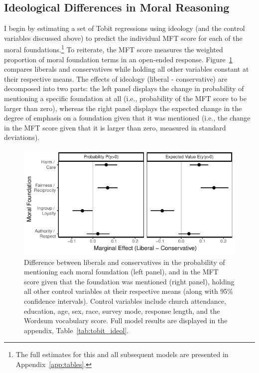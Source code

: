 \documentclass[12pt]{article}
\begin{document}


\subsection*{Ideological Differences in Moral Reasoning}

I begin by estimating a set of Tobit regressions using ideology (and the control variables discussed above) to predict the individual MFT score for each of the moral foundations.\footnote{The full estimates for this and all subsequent models are presented in Appendix~\ref{app:tables}.} To reiterate, the MFT score measures the weighted proportion of moral foundation terms in an open-ended response. Figure~\ref{fig:tobit_ideol} compares liberals and conservatives while holding all other variables constant at their respective means. The effects of ideology (liberal - conservative) are decomposed into two parts: the left panel displays the change in probability of mentioning a specific foundation at all (i.e., probability of the MFT score to be larger than zero), whereas the right panel displays the expected change in the degree of emphasis on a foundation given that it was mentioned  (i.e., the change in the MFT score given that it is larger than zero, measured in standard deviations).

\begin{figure}[ht]\centering
\includegraphics{../calc/fig/tobit_ideol.pdf}
\caption{Difference between liberals and conservatives in the probability of mentioning each moral foundation (left panel), and in the MFT score given that the foundation was mentioned (right panel), holding all other control variables at their respective means (along with 95\% confidence intervals). Control variables include church attendance, education, age, sex, race, survey mode, response length, and the Wordsum vocabulary score. Full model results are displayed in the appendix, Table~\ref{tab:tobit_ideol}.
}\label{fig:tobit_ideol}
\end{figure}
\end{document}
